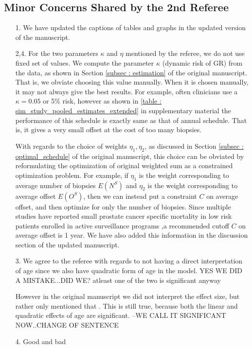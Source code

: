 \subsection*{Minor Concerns Shared by the 2nd Referee}

\begin{enumerate}
	\item[1.] We have updated the captions of tables and graphs in the updated version of the manuscript.
	\item[2,4.] For the two parameters $\kappa$ and $\eta$ mentioned by the referee, we do not use fixed set of values. We compute the parameter $\kappa$ (dynamic risk of GR) from the data, as shown in Section \ref{subsec : estimation} of the original manuscript. That is, we obviate choosing this value manually. When it is chosen manually, it may not always give the best results. For example, often clinicians use a $\kappa = 0.05$ or 5\% risk, however as shown in \ref{table : sim_study_pooled_estimates_extended} in supplementary material the performance of this schedule is exactly same as that of annual schedule. That is, it gives a very small offset at the cost of too many biopsies. 

	With regards to the choice of weights $\eta_1, \eta_2$, as discussed in Section \ref{subsec : optimal_schedule} of the original manuscript, this choice can be obviated by reformulating the optimization of original weighted sum as a constrained optimization problem. For example, if $\eta_1$ is the weight corresponding to average number of biopsies $E(N^S)$ and $\eta_2$ is the weight corresponding to average offset $E(O^S)$, then we can instead put a constraint $C$ on average offset, and then optimize for only the number of biopsies. Since multiple studies have reported small prostate cancer specific mortality in low risk patients enrolled in active surveillance programs \citep{loeb2016immediate,tosoian2011active,klotz2009clinical},a recommended cutoff $C$ on average offset is 1 year. We have also added this information in the discussion section of the updated manuscript.

	\item[3.] We agree to the referee with regards to not having a direct interpretation of age since we also have quadratic form of age in the model.
YES WE DID A MISTAKE...DID WE? atleast one of the two is significant anyway

 However in the original manuscript we did not interpret the effect size, but rather only mentioned that . This is still true, because both the linear and quadratic effects of age are significant. --WE CALL IT SIGNIFICANT NOW..CHANGE OF SENTENCE

 \item[4.] Good and bad 
\end{enumerate}


